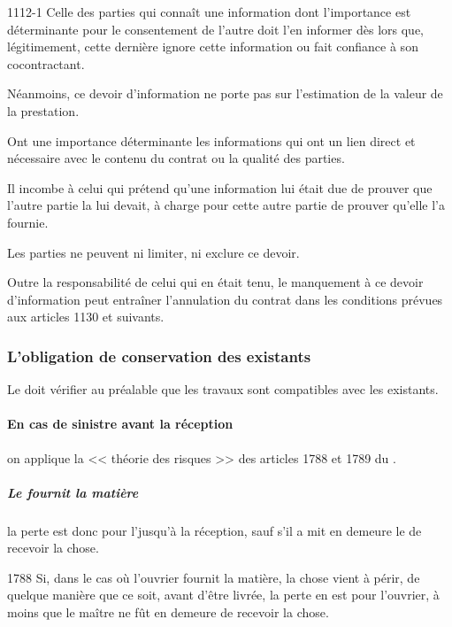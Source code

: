 				\begin{citationArticleCciv}{1112-1}
					Celle des parties qui connaît une information dont l'importance est déterminante pour le consentement de l'autre doit l'en informer dès lors que, légitimement, cette dernière ignore cette information ou fait confiance à son cocontractant.

					Néanmoins, ce devoir d'information ne porte pas sur l'estimation de la valeur de la prestation.

					Ont une importance déterminante les informations qui ont un lien direct et nécessaire avec le contenu du contrat ou la qualité des parties.

					Il incombe à celui qui prétend qu'une information lui était due de prouver que l'autre partie la lui devait, à charge pour cette autre partie de prouver qu'elle l'a fournie.

					Les parties ne peuvent ni limiter, ni exclure ce devoir.

					Outre la responsabilité de celui qui en était tenu, le manquement à ce devoir d'information peut entraîner l'annulation du contrat dans les conditions prévues aux articles 1130 et suivants.
				\end{citationArticleCciv}


			\subsubsection{L'obligation de conservation des existants}

				Le \lo doit vérifier au préalable que les travaux sont compatibles avec les existants.

				\paragraph{En cas de sinistre avant la réception} on applique la << théorie des risques >> des articles 1788 et 1789 du \cciv.

				\subparagraph{Le \lo fournit la matière} la perte est donc pour l'\E jusqu'à la réception, sauf s'il a mit en demeure le \Mo de recevoir la chose.

				\begin{citationArticleCciv}{1788}
					Si, dans le cas où l'ouvrier fournit la matière, la chose vient à périr, de quelque manière que ce soit, avant d'être livrée, la perte en est pour l'ouvrier, à moins que le maître ne fût en demeure de recevoir la chose.
				\end{citationArticleCciv}


